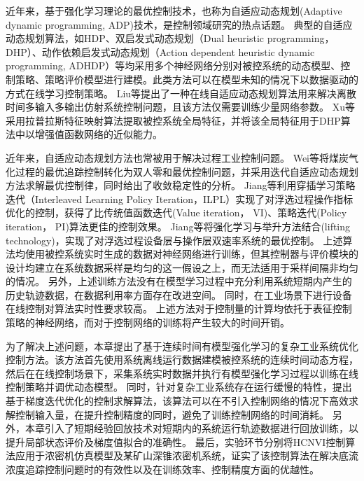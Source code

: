 近年来，基于强化学习\cite{Sutton2018}\cite{F.L.LewisD.Vrabie2012}理论的最优控制技术，也称为自适应动态规划(Adaptive
dynamic programming,
ADP)\cite{Prokhorov1997}\cite{Werbos2008}\cite{Duan:643}技术，是控制领域研究的热点话题。
典型的自适应动态规划算法，如HDP、双启发式动态规划（Dual heuristic
programming，DHP）、动作依赖启发式动态规划（Action dependent
heuristic dynamic programming,
ADHDP）\cite{Werbos2008}等均采用多个神经网络分别对被控系统的动态模型、控制策略、策略评价模型进行建模。此类方法可以在模型未知的情况下以数据驱动的方式在线学习控制策略。
Liu等\cite{Liu2015}提出了一种在线自适应动态规划算法用来解决离散时间多输入多输出仿射系统控制问题，且该方法仅需要训练少量网络参数。
Xu等\cite{XuX2017}采用拉普拉斯特征映射算法提取被控系统全局特征，并将该全局特征用于DHP算法中以增强值函数网络的近似能力。

近年来，自适应动态规划方法也常被用于解决过程工业控制问题。
Wei等\cite{Wei2014}将煤炭气化过程的最优追踪控制转化为双人零和最优控制问题，并采用迭代自适应动态规划方法求解最优控制律，同时给出了收敛稳定性的分析。
Jiang等\cite{Jiang2018}利用穿插学习策略迭代（Interleaved Learning
Policy Iteration，ILPL）实现了对浮选过程操作指标优化的控制，获得了比传统值函数迭代(Value iteration， VI)、策略迭代(Policy iteration， PI)算法更佳的控制效果。
Jiang等\cite{Jiang2019}将强化学习与举升方法结合(lifting
technology)，实现了对浮选过程设备层与操作层双速率系统的最优控制。
上述算法均使用被控系统实时生成的数据对神经网络进行训练，但其控制器与评价模块的设计均建立在系统数据采样是均匀的这一假设之上，而无法适用于采样间隔非均匀的情况。
另外，上述训练方法没有在模型学习过程中充分利用系统短期内产生的历史轨迹数据，在数据利用率方面存在改进空间。
同时，在工业场景下进行设备在线控制对算法实时性要求较高。
上述方法对于控制量的计算均依托于表征控制策略的神经网络，而对于控制网络的训练将产生较大的时间开销。

为了解决上述问题，本章提出了基于连续时间有模型强化学习的复杂工业系统优化控制方法。该方法首先使用系统离线运行数据建模被控系统的连续时间动态方程，
然后在在线控制场景下，采集系统实时数据并执行有模型强化学习过程以训练在线控制策略并调优动态模型。
同时，针对复杂工业系统存在运行缓慢的特性，提出基于梯度迭代优化的控制求解算法，该算法可以在不引入控制网络的情况下高效求解控制输入量，在提升控制精度的同时，避免了训练控制网络的时间消耗。
另外，本章引入了短期经验回放技术\cite{Modares2014}\cite{Mnih2013}对短期内的系统运行轨迹数据进行回放训练，以提升局部状态评价及梯度值拟合的准确性。
最后，实验环节分别将HCNVI控制算法应用于浓密机仿真模型及某矿山深锥浓密机系统，证实了该控制算法在解决底流浓度追踪控制问题时的有效性以及在训练效率、控制精度方面的优越性。




